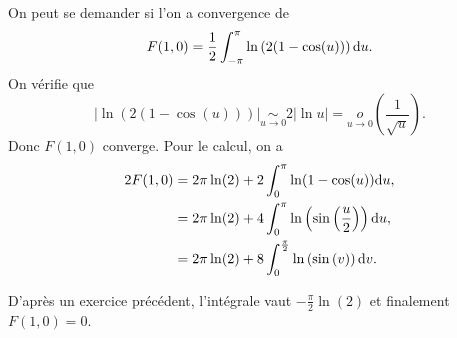 \documentclass[12pt]{article}
\begin{document}
\begin{remark}
    On peut se demander si l'on a convergence de 
    \begin{equation*}
        F(1,0)=\frac{1}{2}\int_{-\pi}^{\pi}\ln\left(2(1-\cos(u))\right)\mathrm{d} u.    
    \end{equation*}
    On vérifie que 
    \begin{equation*}
        \left\lvert\ln(2(1-\cos(u)))\right\vert\underset{u\to0}{\sim}2\left\lvert\ln u\right\rvert=\underset{u\to0}{o}\left(\frac{1}{\sqrt{u}}\right).
    \end{equation*}
    Donc $F(1,0)$ converge. Pour le calcul, on a 
    \begin{align*}
        2F(1,0)
        &=2\pi\ln(2)+2\int_{0}^{\pi}\ln(1-\cos(u))\mathrm{d} u,\\
        &=2\pi\ln(2)+4\int_{0}^{\pi}\ln\left(\sin\left(\frac{u}{2}\right)\right)\mathrm{d} u,\\
        &=2\pi\ln(2)+8\int_{0}^{\frac{\pi}{2}}\ln\left(\sin\left(v\right)\right)\mathrm{d} v.
    \end{align*}

    D'après un exercice précédent, l'intégrale vaut $-\frac{\pi}{2}\ln(2)$ et finalement $F(1,0)=0$.
\end{remark}
\end{document}
